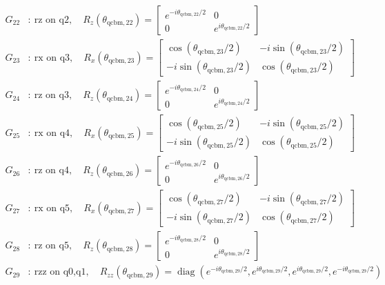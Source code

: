 \begin{align*}
G_{22}&:\ \text{rz on q2},\quad R_z(\theta_{\mathrm{qcbm},22})=\begin{bmatrix}e^{-i\theta_{\mathrm{qcbm},22}/2}&0\\0&e^{i\theta_{\mathrm{qcbm},22}/2}\end{bmatrix}\\
G_{23}&:\ \text{rx on q3},\quad R_x(\theta_{\mathrm{qcbm},23})=\begin{bmatrix}\cos(\theta_{\mathrm{qcbm},23}/2)&-i\sin(\theta_{\mathrm{qcbm},23}/2)\\-i\sin(\theta_{\mathrm{qcbm},23}/2)&\cos(\theta_{\mathrm{qcbm},23}/2)\end{bmatrix}\\
G_{24}&:\ \text{rz on q3},\quad R_z(\theta_{\mathrm{qcbm},24})=\begin{bmatrix}e^{-i\theta_{\mathrm{qcbm},24}/2}&0\\0&e^{i\theta_{\mathrm{qcbm},24}/2}\end{bmatrix}\\
G_{25}&:\ \text{rx on q4},\quad R_x(\theta_{\mathrm{qcbm},25})=\begin{bmatrix}\cos(\theta_{\mathrm{qcbm},25}/2)&-i\sin(\theta_{\mathrm{qcbm},25}/2)\\-i\sin(\theta_{\mathrm{qcbm},25}/2)&\cos(\theta_{\mathrm{qcbm},25}/2)\end{bmatrix}\\
G_{26}&:\ \text{rz on q4},\quad R_z(\theta_{\mathrm{qcbm},26})=\begin{bmatrix}e^{-i\theta_{\mathrm{qcbm},26}/2}&0\\0&e^{i\theta_{\mathrm{qcbm},26}/2}\end{bmatrix}\\
G_{27}&:\ \text{rx on q5},\quad R_x(\theta_{\mathrm{qcbm},27})=\begin{bmatrix}\cos(\theta_{\mathrm{qcbm},27}/2)&-i\sin(\theta_{\mathrm{qcbm},27}/2)\\-i\sin(\theta_{\mathrm{qcbm},27}/2)&\cos(\theta_{\mathrm{qcbm},27}/2)\end{bmatrix}\\
G_{28}&:\ \text{rz on q5},\quad R_z(\theta_{\mathrm{qcbm},28})=\begin{bmatrix}e^{-i\theta_{\mathrm{qcbm},28}/2}&0\\0&e^{i\theta_{\mathrm{qcbm},28}/2}\end{bmatrix}\\
G_{29}&:\ \text{rzz on q0,q1},\quad R_{zz}(\theta_{\mathrm{qcbm},29})=\operatorname{diag}(e^{-i\theta_{\mathrm{qcbm},29}/2},e^{i\theta_{\mathrm{qcbm},29}/2},e^{i\theta_{\mathrm{qcbm},29}/2},e^{-i\theta_{\mathrm{qcbm},29}/2})\\

\end{align*}
